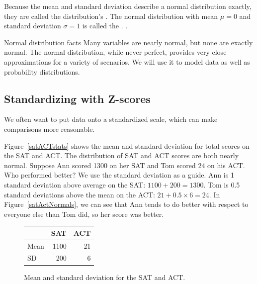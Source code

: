Because the mean and standard deviation describe a normal distribution exactly, they are called the distribution's .  The normal distribution with mean $\mu=0$ and standard deviation $\sigma = 1$ is called the .%
.


\begin{onebox}{Normal distribution facts}
Many variables are nearly normal, but none are exactly normal. The normal distribution, while never perfect, provides very close approximations for a variety of scenarios. We will use it to model data as well as probability distributions.\vspace{0.7mm}\end{onebox}

\subsection{Standardizing with Z-scores}
\noindent%
We often want to put data onto a standardized scale,
which can make comparisons more reasonable.

\newcommand{\satmean}{1100}
\newcommand{\satsd}{200}
\newcommand{\actmean}{21}
\newcommand{\actsd}{6}
\newcommand{\annsatscore}{1300}
\newcommand{\annsatzscore}{1}
\newcommand{\tomsatscore}{24}
\newcommand{\tomsatzscore}{0.5}

\begin{examplewrap}
\begin{nexample}{Figure~\vref{satACTstats} shows the mean
    and standard deviation for total scores on the SAT and ACT.
    The distribution of SAT and ACT scores are both nearly normal.
    Suppose Ann scored \annsatscore{} on her SAT and Tom scored
    \tomsatscore{} on his ACT.
    Who performed better?}
  \label{actSAT}%
  We use the standard deviation as a guide.
  Ann is \annsatzscore{} standard deviation above average
  on the SAT: $\satmean{} + \satsd{} = \annsatscore{}$.
  Tom is \tomsatzscore{} standard deviations above the mean
  on the ACT:
  $\actmean{} + \tomsatzscore{} \times \actsd{} = \tomsatscore{}$.
  In Figure~\ref{satActNormals}, we can see that Ann tends
  to do better with respect to everyone else than Tom did,
  so her score was better.
\end{nexample}
\end{examplewrap}

\begin{figure}[h]
\centering
\begin{tabular}{l r r}
  \hline
  & SAT & ACT \\
  \hline
  Mean \hspace{0.3cm} & \satmean{} & \actmean{} \\
  SD & \satsd{} & \actsd{} \\
  \hline
\end{tabular}
\caption{Mean and standard deviation for the SAT and ACT.}
\label{satACTstats}
\end{figure}

